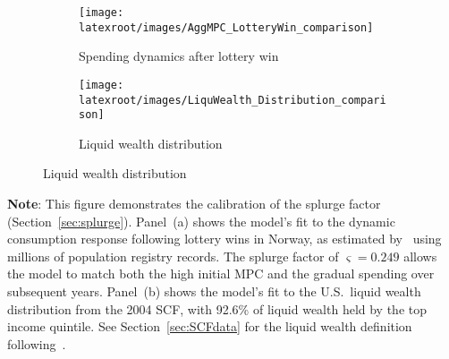 \documentclass{econsocart}
\begin{document}
\begin{figure}[H]
  \centering
  \caption{Model fit to spending behavior and wealth distribution}
  \label{fig:splurge_estimation} 
  \noindent\begin{minipage}{\textwidth}
    \centering
    \begin{subfigure}[b]{.48\linewidth}
      \centering
      \texttt{[image: \\latexroot/images/AggMPC\_LotteryWin\_comparison]}
      \caption{Spending dynamics after lottery win}
      \label{fig:aggmpclotterywin} 
    \end{subfigure}
    \hfill
    \begin{subfigure}[b]{.48\linewidth}
      \centering
      \texttt{[image: \\latexroot/images/LiquWealth\_Distribution\_comparison]}
      \caption{Liquid wealth distribution}
      \label{fig:liquwealthdistribution} 
    \end{subfigure}
  \end{minipage}
\end{figure}
\noindent\parbox{\textwidth}{\footnotesize
  \textbf{Note}: This figure demonstrates the calibration of the splurge factor (Section~\ref{sec:splurge}).
  Panel~(a) shows the model's fit to the dynamic consumption response following lottery wins in Norway,
  as estimated by~\cite{fagereng-mpc-2021} using millions of population registry records.
  The splurge factor of $\varsigma = 0.249$ allows the model to match both the high initial MPC
  and the gradual spending over subsequent years.
  Panel~(b) shows the model's fit to the U.S.\ liquid wealth distribution from the 2004 SCF,
  with 92.6\% of liquid wealth held by the top income quintile.
  See Section~\ref{sec:SCFdata} for the liquid wealth definition following~\cite{kaplan2014model}.
}

\vspace{0.5em}  
\end{document}
